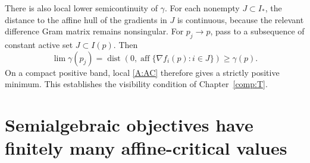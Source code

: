 There is also local lower semicontinuity of $\gamma$. For each nonempty $J\subset I_*$, the distance to the affine hull of the gradients in $J$ is continuous, because the relevant difference Gram matrix remains nonsingular. For $p_j\to p$, pass to a subsequence of constant active set $J\subset I(p)$. Then
\[
 \lim\gamma(p_j)=\operatorname{dist}(0,\operatorname{aff}\{\nabla f_i(p):i\in J\})\ge\gamma(p).
\]
On a compact positive band, local \eqref{A:AC} therefore gives a strictly positive minimum. This establishes the visibility condition of Chapter~\ref{comp:T}.



\section{Semialgebraic objectives have finitely many affine-critical values}

